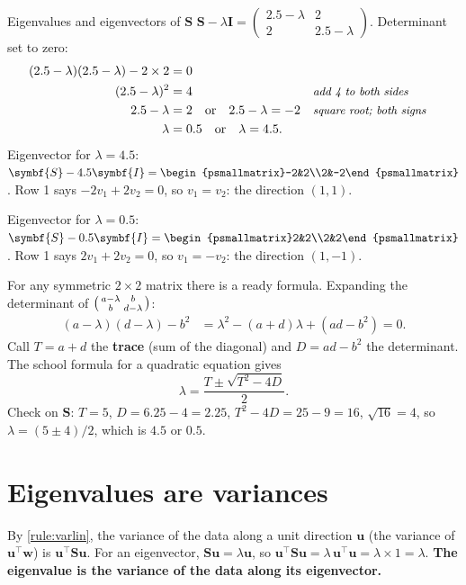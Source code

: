\documentclass[11pt,a4paper,oneside,openany]{book}
\newcommand{\B}[1]{{\symbf{#1}}}
\newcommand{\B}[1]{{\bm{#1}}}
\newcommand{\T}{^{\top}}
\newcommand{\vu}{\B{u}}
\newcommand{\vw}{\B{w}}
\newcommand{\mS}{\B{S}}
\newcommand{\mI}{\B{I}}
\newcommand{\why}[1]{&&\text{\small\itshape #1}}
\begin{document}
\begin{worked}[label=we:eig]{Eigenvalues and eigenvectors of $\mS$}
$\mS-\lambda\mI=\begin{pmatrix}2.5-\lambda&2\\2&2.5-\lambda\end{pmatrix}$. Determinant set to zero:
\begin{align*}
(2.5-\lambda)(2.5-\lambda)-2\times2 &= 0\\
(2.5-\lambda)^2 &= 4 \why{add 4 to both sides}\\
2.5-\lambda &= 2\quad\text{or}\quad 2.5-\lambda=-2 \why{square root; both signs}\\
\lambda &= 0.5\quad\text{or}\quad \lambda=4.5 .
\end{align*}
Eigenvector for $\lambda=4.5$: $\mS-4.5\mI=\begin{psmallmatrix}-2&2\\2&-2\end{psmallmatrix}$. Row 1 says $-2v_1+2v_2=0$, so
$v_1=v_2$: the direction $(1,1)$.

Eigenvector for $\lambda=0.5$: $\mS-0.5\mI=\begin{psmallmatrix}2&2\\2&2\end{psmallmatrix}$. Row 1 says $2v_1+2v_2=0$, so
$v_1=-v_2$: the direction $(1,-1)$.
\end{worked}

For any symmetric $2\times2$ matrix there is a ready formula. Expanding the determinant of
$\begin{psmallmatrix}a-\lambda&b\\b&d-\lambda\end{psmallmatrix}$:
\begin{align*}
(a-\lambda)(d-\lambda)-b^2 &= \lambda^2-(a+d)\lambda+(ad-b^2)=0 .
\end{align*}
Call $T=a+d$ the \textbf{trace} (sum of the diagonal) and $D=ad-b^2$ the determinant. The school formula for a quadratic
equation gives
\[
  \lambda=\frac{T\pm\sqrt{T^2-4D}}{2}.
\]
Check on $\mS$: $T=5$, $D=6.25-4=2.25$, $T^2-4D=25-9=16$, $\sqrt{16}=4$, so $\lambda=(5\pm4)/2$, which is $4.5$ or $0.5$.

\section{Eigenvalues are variances}

By \cref{rule:varlin}, the variance of the data along a unit direction $\vu$ (the variance of $\vu\T\vw$) is $\vu\T\mS\vu$.
For an eigenvector, $\mS\vu=\lambda\vu$, so $\vu\T\mS\vu=\lambda\,\vu\T\vu=\lambda\times1=\lambda$. \textbf{The eigenvalue is the
variance of the data along its eigenvector.}
\end{document}
